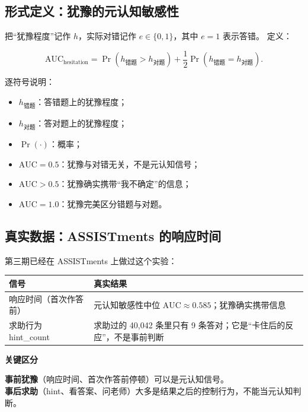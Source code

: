 \documentclass[UTF8,a4paper,11pt]{ctexart}
\newenvironment{explainbox}[1]
{\begin{center}\begin{minipage}{0.94\textwidth}\colorbox{boxbg}{\parbox{0.92\textwidth}{\textbf{#1}\par\vspace{2pt}}}}
{\end{minipage}\end{center}}
\begin{document}
\subsection{形式定义：犹豫的元认知敏感性}

把“犹豫程度”记作 $h$，实际对错记作 $e\in\{0,1\}$，其中 $e=1$ 表示答错。
定义：

\begin{equation}
\mathrm{AUC}_{\text{hesitation}}
=
\Pr(h_{\text{错题}}>h_{\text{对题}})
+\frac12\Pr(h_{\text{错题}}=h_{\text{对题}}).
\end{equation}

逐符号说明：

\begin{itemize}[leftmargin=2em]
\item $h_{\text{错题}}$：答错题上的犹豫程度；
\item $h_{\text{对题}}$：答对题上的犹豫程度；
\item $\Pr(\cdot)$：概率；
\item $\mathrm{AUC}=0.5$：犹豫与对错无关，不是元认知信号；
\item $\mathrm{AUC}>0.5$：犹豫确实携带“我不确定”的信息；
\item $\mathrm{AUC}=1.0$：犹豫完美区分错题与对题。
\end{itemize}

\subsection{真实数据：ASSISTments 的响应时间}

第三期已经在 ASSISTments 上做过这个实验：

\begin{center}
\begin{longtable}{@{}p{5.0cm}p{8.5cm}@{}}
\toprule
\textbf{信号} & \textbf{真实结果} \\
\midrule
响应时间（首次作答前） & 元认知敏感性中位 $\mathrm{AUC}\approx0.585$；犹豫确实携带信息 \\
求助行为 hint\_count & 求助过的 40{,}042 条里只有 9 条答对；它是“卡住后的反应”，不是事前判断 \\
\bottomrule
\end{longtable}
\end{center}

\begin{explainbox}{关键区分}
\textbf{事前犹豫}（响应时间、首次作答前停顿）可以是元认知信号。\\
\textbf{事后求助}（hint、看答案、问老师）大多是结果之后的控制行为，不能当元认知判断。
\end{explainbox}
\end{document}
